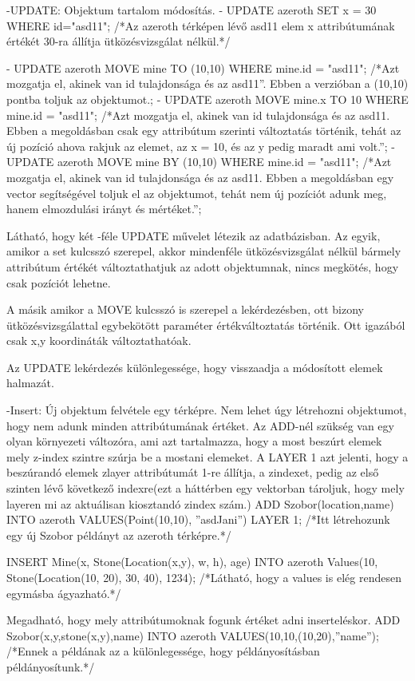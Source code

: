-UPDATE: Objektum tartalom módosítás.
- UPDATE azeroth SET x = 30 WHERE id="asd11";
/*Az azeroth térképen lévő asd11 elem x attribútumának értékét 30-ra állítja ütközésvizsgálat nélkül.*/

- UPDATE azeroth MOVE  mine TO  (10,10) WHERE mine.id = "asd11"; /*Azt mozgatja el, akinek van id tulajdonsága és az asd11”. Ebben a verzióban a (10,10) pontba toljuk az objektumot.;
- UPDATE azeroth MOVE  mine.x TO 10 WHERE mine.id = "asd11"; /*Azt mozgatja el, akinek van id tulajdonsága és az asd11. Ebben a megoldásban csak egy attribútum szerinti változtatás történik, tehát az új pozíció ahova rakjuk az elemet, az x = 10, és az y pedig maradt ami volt.”;
- UPDATE azeroth MOVE  mine BY  (10,10) WHERE mine.id = "asd11"; /*Azt mozgatja el, akinek van id tulajdonsága és az asd11. Ebben a megoldásban egy vector segítségével toljuk el az objektumot, tehát nem új pozíciót adunk meg, hanem elmozdulási irányt és mértéket.”;

Látható, hogy két -féle UPDATE művelet létezik az adatbázisban. Az egyik, amikor a set kulcsszó szerepel, akkor mindenféle ütközésvizsgálat nélkül bármely attribútum értékét változtathatjuk az adott objektumnak, nincs megkötés, hogy csak pozíciót lehetne.

A másik amikor a MOVE kulcsszó is szerepel a lekérdezésben, ott bizony ütközésvizsgálattal egybekötött paraméter értékváltoztatás történik. Ott igazából  csak x,y koordináták változtathatóak.

Az UPDATE lekérdezés különlegessége, hogy visszaadja a módosított elemek halmazát.

-Insert: Új objektum felvétele egy térképre. 
Nem lehet úgy létrehozni objektumot, hogy nem adunk minden attribútumának értéket.
Az ADD-nél szükség van egy olyan környezeti változóra, ami azt tartalmazza, hogy a most beszúrt elemek mely z-index szintre szúrja be a mostani elemeket.
A LAYER 1 azt jelenti, hogy a beszúrandó elemek zlayer attribútumát 1-re állítja, a zindexet, pedig az első szinten lévő következő indexre(ezt a háttérben egy vektorban tároljuk, hogy mely layeren mi az aktuálisan kiosztandó zindex szám.)
ADD Szobor(location,name) INTO azeroth VALUES(Point(10,10), ”asdJani”) LAYER 1; /*Itt létrehozunk egy új Szobor példányt az azeroth térképre.*/

INSERT Mine(x, Stone(Location(x,y), w, h), age) INTO azeroth Values(10, Stone(Location(10, 20), 30, 40), 1234); /*Látható, hogy a values is elég rendesen egymásba ágyazható.*/

Megadható, hogy mely attribútumoknak fogunk értéket adni inserteléskor.
ADD Szobor(x,y,stone(x,y),name) INTO azeroth VALUES(10,10,(10,20),”name”);
/*Ennek a példának az a különlegessége, hogy példányosításban példányosítunk.*/

